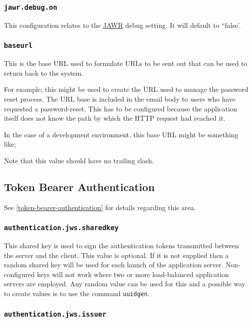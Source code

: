 \subsubsection{\tt jawr.debug.on}

This configuration relates to the \href{https://jawr.java.net/}{JAWR} debug setting.  It will default to ``false'.

\subsubsection{\tt baseurl}

This is the base URL used to formulate URLs to be sent out that can be used to return back to the system.

For example; this might be used to create the URL used to manage the password reset process.  The URL base is included in the email body to users who have requested a password-reset.  This has to be configured because the application itself does not know the path by which the HTTP request had reached it.

In the case of a development environment, this base URL might be something like;


Note that this value should have no trailing slash.

\subsection{Token Bearer Authentication}

See \ref{token-bearer-authentication} for details regarding this area.

\subsubsection{\tt authentication.jws.sharedkey}

This shared key is used to sign the authentication tokens transmitted between the server and the client.  This value is optional.  If it is not supplied then a random shared key will be used for each launch of the application server.  Non-configured keys will not work where two or more load-balanced application servers are employed.  Any random value can be used for this and a possible way to create values is to use the command {\tt uuidgen}.

\subsubsection{\tt authentication.jws.issuer}


